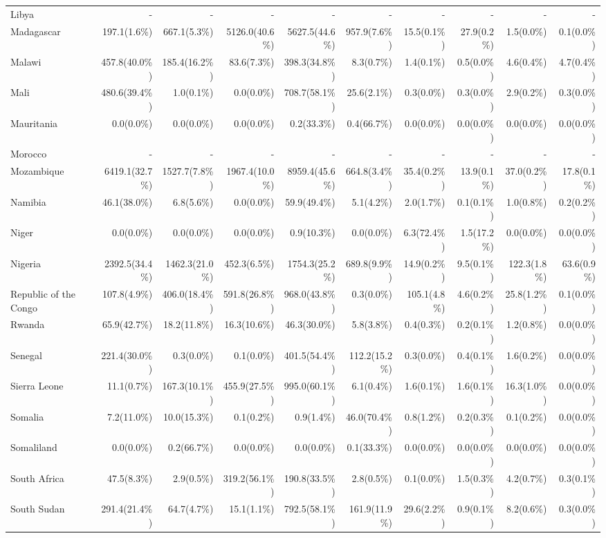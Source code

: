 \begin{scriptsize}
\begin{landscape}
\begin{center}
\begin{longtable}[ht]{lrrrrrrrrr}
			Libya&-&-&-&-&-&-&-&-&-\\
			Madagascar&197.1(1.6\%)&667.1(5.3\%)&5126.0(40.6\%)&5627.5(44.6\%)&957.9(7.6\%)&15.5(0.1\%)&27.9(0.2\%)&1.5(0.0\%)&0.1(0.0\%)\\
			Malawi&457.8(40.0\%)&185.4(16.2\%)&83.6(7.3\%)&398.3(34.8\%)&8.3(0.7\%)&1.4(0.1\%)&0.5(0.0\%)&4.6(0.4\%)&4.7(0.4\%)\\
			Mali&480.6(39.4\%)&1.0(0.1\%)&0.0(0.0\%)&708.7(58.1\%)&25.6(2.1\%)&0.3(0.0\%)&0.3(0.0\%)&2.9(0.2\%)&0.3(0.0\%)\\
			Mauritania&0.0(0.0\%)&0.0(0.0\%)&0.0(0.0\%)&0.2(33.3\%)&0.4(66.7\%)&0.0(0.0\%)&0.0(0.0\%)&0.0(0.0\%)&0.0(0.0\%)\\
			Morocco&-&-&-&-&-&-&-&-&-\\
			Mozambique&6419.1(32.7\%)&1527.7(7.8\%)&1967.4(10.0\%)&8959.4(45.6\%)&664.8(3.4\%)&35.4(0.2\%)&13.9(0.1\%)&37.0(0.2\%)&17.8(0.1\%)\\
			Namibia&46.1(38.0\%)&6.8(5.6\%)&0.0(0.0\%)&59.9(49.4\%)&5.1(4.2\%)&2.0(1.7\%)&0.1(0.1\%)&1.0(0.8\%)&0.2(0.2\%)\\
			Niger&0.0(0.0\%)&0.0(0.0\%)&0.0(0.0\%)&0.9(10.3\%)&0.0(0.0\%)&6.3(72.4\%)&1.5(17.2\%)&0.0(0.0\%)&0.0(0.0\%)\\
			Nigeria&2392.5(34.4\%)&1462.3(21.0\%)&452.3(6.5\%)&1754.3(25.2\%)&689.8(9.9\%)&14.9(0.2\%)&9.5(0.1\%)&122.3(1.8\%)&63.6(0.9\%)\\
			Republic of the Congo&107.8(4.9\%)&406.0(18.4\%)&591.8(26.8\%)&968.0(43.8\%)&0.3(0.0\%)&105.1(4.8\%)&4.6(0.2\%)&25.8(1.2\%)&0.1(0.0\%)\\
			Rwanda&65.9(42.7\%)&18.2(11.8\%)&16.3(10.6\%)&46.3(30.0\%)&5.8(3.8\%)&0.4(0.3\%)&0.2(0.1\%)&1.2(0.8\%)&0.0(0.0\%)\\
			Senegal&221.4(30.0\%)&0.3(0.0\%)&0.1(0.0\%)&401.5(54.4\%)&112.2(15.2\%)&0.3(0.0\%)&0.4(0.1\%)&1.6(0.2\%)&0.0(0.0\%)\\
			Sierra Leone&11.1(0.7\%)&167.3(10.1\%)&455.9(27.5\%)&995.0(60.1\%)&6.1(0.4\%)&1.6(0.1\%)&1.6(0.1\%)&16.3(1.0\%)&0.0(0.0\%)\\
			Somalia&7.2(11.0\%)&10.0(15.3\%)&0.1(0.2\%)&0.9(1.4\%)&46.0(70.4\%)&0.8(1.2\%)&0.2(0.3\%)&0.1(0.2\%)&0.0(0.0\%)\\
			Somaliland&0.0(0.0\%)&0.2(66.7\%)&0.0(0.0\%)&0.0(0.0\%)&0.1(33.3\%)&0.0(0.0\%)&0.0(0.0\%)&0.0(0.0\%)&0.0(0.0\%)\\
			South Africa&47.5(8.3\%)&2.9(0.5\%)&319.2(56.1\%)&190.8(33.5\%)&2.8(0.5\%)&0.1(0.0\%)&1.5(0.3\%)&4.2(0.7\%)&0.3(0.1\%)\\
			South Sudan&291.4(21.4\%)&64.7(4.7\%)&15.1(1.1\%)&792.5(58.1\%)&161.9(11.9\%)&29.6(2.2\%)&0.9(0.1\%)&8.2(0.6\%)&0.3(0.0\%)\\

\end{longtable}
\end{center}
\end{landscape}
\end{scriptsize}
